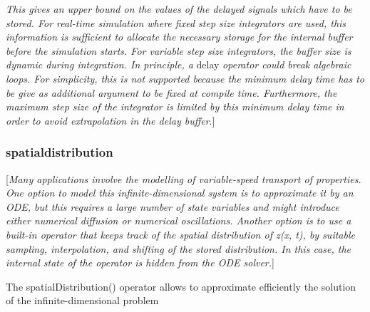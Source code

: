 \documentclass[10pt,a4paper]{report}
\def\doublelabel#1{\label{#1}\hypertarget{#1}{}}
\begin{document}
\emph{This gives an upper bound on the values of the delayed signals
which have to be stored. For real-time simulation where fixed step size
integrators are used, this information is sufficient to allocate the
necessary storage for the internal buffer before the simulation starts.
For variable step size integrators, the buffer size is dynamic during
integration. In principle, a} delay \emph{operator could break algebraic
loops. For simplicity, this is not supported because the minimum delay
time has to be give as additional argument to be fixed at compile time.
Furthermore, the maximum step size of the integrator is limited by this
minimum delay time in order to avoid extrapolation in the delay
buffer}.{]}

\subsubsection{spatialdistribution}\doublelabel{spatialdistribution}

{[}\emph{Many applications involve the modelling of variable-speed
transport of properties. One option to model this infinite-dimensional
system is to approximate it by an ODE, but this requires a large number
of state variables and might introduce either numerical diffusion or
numerical oscillations. Another option is to use a built-in operator
that keeps track of the spatial distribution of z(x, t), by suitable
sampling, interpolation, and shifting of the stored distribution. In
this case, the internal state of the operator is hidden from the ODE
solver.}{]}

The spatialDistribution() operator allows to approximate efficiently the
solution of the infinite-dimensional problem
\end{document}
